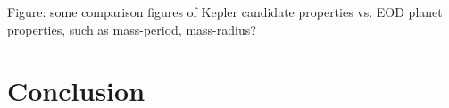 \documentclass[11pt,preprint]{aastex}
\begin{document}
\begin{CJK*}{UTF8}{gbsn}
Figure: some comparison figures of Kepler candidate properties
vs. EOD planet properties, such as mass-period, mass-radius?


\section{Conclusion}\label{sec:conclusion}



\acknowledgments



%


\clearpage


\end{CJK*}
\end{document}
